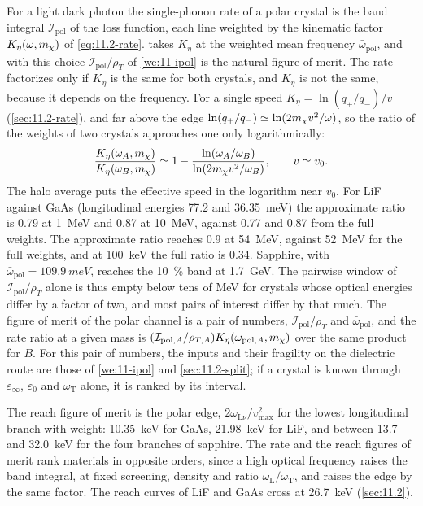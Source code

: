 For a light dark photon the single-phonon rate of a polar crystal is the band integral $\mathcal{I}_{\mathrm{pol}}$ of the loss function, each line weighted by the kinematic factor $K_\eta(\omega,m_{\chi})$ of \cref{eq:11.2-rate}.  takes $K_\eta$ at the weighted mean frequency $\bar\omega_{\mathrm{pol}}$, and with this choice $\mathcal{I}_{\mathrm{pol}}/\rho_T$ of \cref{we:11-ipol} is the natural figure of merit. The rate factorizes only if $K_\eta$ is the same for both crystals, and $K_\eta$ is not the same, because it depends on the frequency. For a single speed $K_\eta = \ln(q_+/q_-)/v$ (\cref{sec:11.2-rate}), and far above the edge $\ln(q_+/q_-) \simeq \ln(2m_{\chi} v^2/\omega)$, so the ratio of the weights of two crystals approaches one only logarithmically:
\begin{equation*}
  \frac{K_\eta(\omega_A,m_{\chi})}{K_\eta(\omega_B,m_{\chi})} \simeq 1 - \frac{\ln(\omega_A/\omega_B)}{\ln(2m_{\chi} v^2/\omega_B)} , \qquad v \simeq v_0 .
\end{equation*}
The halo average puts the effective speed in the logarithm near $v_0$. For LiF against GaAs (longitudinal energies 77.2 and \SI{36.35}{meV}) the approximate ratio is 0.79 at \SI{1}{MeV} and 0.87 at \SI{10}{MeV}, against 0.77 and 0.87 from the full weights. The approximate ratio reaches 0.9 at \SI{54}{MeV}, against \SI{52}{MeV} for the full weights, and at \SI{100}{keV} the full ratio is 0.34. Sapphire, with $\bar\omega_{\mathrm{pol}} = \SI{109.9}{meV}$, reaches the \SI{10}{\percent} band at \SI{1.7}{GeV}. The pairwise window of $\mathcal{I}_{\mathrm{pol}}/\rho_T$ alone is thus empty below tens of MeV for crystals whose optical energies differ by a factor of two, and most pairs of interest differ by that much. The figure of merit of the polar channel is a pair of numbers, $\mathcal{I}_{\mathrm{pol}}/\rho_T$ and $\bar\omega_{\mathrm{pol}}$, and the rate ratio at a given mass is $(\mathcal{I}_{\mathrm{pol},A}/\rho_{T,A})K_\eta(\bar\omega_{\mathrm{pol},A},m_{\chi})$ over the same product for $B$. For this pair of numbers, the inputs and their fragility on the dielectric route are those of \cref{we:11-ipol} and \cref{sec:11.2-split}; if a crystal is known through $\varepsilon_\infty$, $\varepsilon_0$ and $\omega_{\mathrm{T}}$ alone, it is ranked by its interval.

The reach figure of merit is the polar edge, $2\omega_{\mathrm{L}\nu}/v_{\mathrm{max}}^2$ for the lowest longitudinal branch with weight: \SI{10.35}{keV} for GaAs, \SI{21.98}{keV} for LiF, and between 13.7 and \SI{32.0}{keV} for the four branches of sapphire. The rate and the reach figures of merit rank materials in opposite orders, since a high optical frequency raises the band integral, at fixed screening, density and ratio $\omega_{\mathrm{L}}/\omega_{\mathrm{T}}$, and raises the edge by the same factor. The reach curves of LiF and GaAs cross at \SI{26.7}{keV} (\cref{sec:11.2}).

